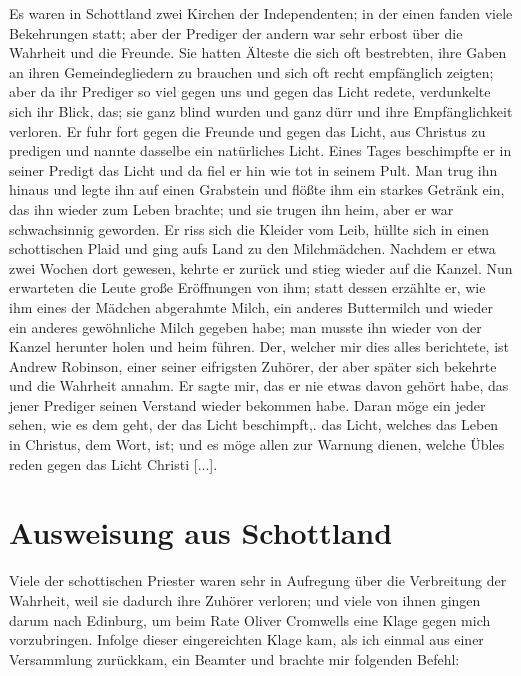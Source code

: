 Es waren in Schottland zwei Kirchen der 
Independenten;
in der einen fanden viele Bekehrungen statt; aber der 
Prediger der andern war sehr erbost über die Wahrheit und die
Freunde. Sie hatten Älteste die sich oft bestrebten, ihre Gaben
an ihren Gemeindegliedern zu brauchen und sich oft recht empfänglich
zeigten; aber da ihr Prediger so viel gegen uns und gegen das
Licht redete, verdunkelte sich ihr Blick, das; sie ganz blind wurden
und ganz dürr und ihre Empfänglichkeit verloren. Er fuhr fort
gegen die Freunde und gegen das Licht, aus Christus zu
predigen und nannte dasselbe ein natürliches Licht. Eines Tages
beschimpfte er in seiner Predigt das Licht und da fiel er hin wie
tot in seinem Pult. Man trug ihn hinaus und legte ihn auf
einen Grabstein und flößte ihm ein starkes Getränk ein, das ihn
wieder zum Leben brachte; und sie trugen ihn heim, aber er war
schwachsinnig geworden. Er riss sich die Kleider vom Leib, hüllte
sich in einen schottischen Plaid und ging aufs Land zu den
Milchmädchen. Nachdem er etwa zwei Wochen dort gewesen,
kehrte er zurück und stieg wieder auf die Kanzel. Nun erwarteten
die Leute große Eröffnungen von ihm; statt dessen erzählte er,
wie ihm eines der Mädchen abgerahmte Milch, ein anderes
Buttermilch und wieder ein anderes gewöhnliche Milch gegeben
habe; man musste ihn wieder von der Kanzel herunter holen und
heim führen. Der, welcher mir dies alles berichtete, ist Andrew
Robinson, einer seiner eifrigsten 
Zuhörer, der aber später sich
bekehrte und die Wahrheit annahm. Er sagte mir, das er nie
etwas davon gehört habe, das jener Prediger seinen Verstand
wieder bekommen habe. Daran möge ein jeder sehen, wie es
dem geht, der das Licht beschimpft,. das Licht, welches das Leben
in Christus, dem Wort, ist; und es möge allen zur Warnung
dienen, welche Übles reden gegen das Licht Christi [...].

\section{Ausweisung aus Schottland}

Viele der schottischen Priester waren sehr in Aufregung über
die Verbreitung der Wahrheit, weil sie dadurch ihre Zuhörer
verloren; und viele von ihnen gingen darum nach Edinburg,
um beim Rate Oliver Cromwells eine Klage gegen mich 
vorzubringen. Infolge dieser eingereichten Klage kam, als ich einmal
aus einer Versammlung zurückkam, ein Beamter und brachte mir
folgenden Befehl:

